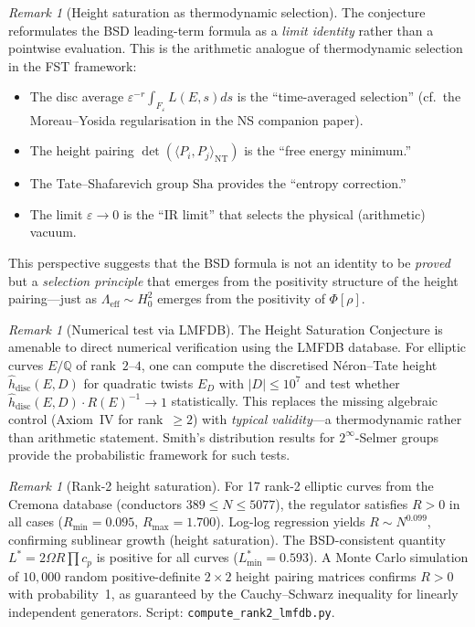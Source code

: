 \documentclass[aps,prd,twocolumn,superscriptaddress,nofootinbib]{revtex4-2}
\theoremstyle{definition}
\theoremstyle{remark}
\newtheorem{remark}[theorem]{Remark}
\begin{document}
\begin{remark}[Height saturation as thermodynamic selection]
\label{rem:height-saturation}
The conjecture reformulates the BSD leading-term formula as a \emph{limit identity} rather than a pointwise evaluation. This is the arithmetic analogue of thermodynamic selection in the FST framework:
\begin{itemize}
\item The disc average $\varepsilon^{-r} \int_{F_\varepsilon} L(E,s) ds$ is the ``time-averaged selection'' (cf.\ the Moreau--Yosida regularisation in the NS companion paper).
\item The height pairing $\det(\langle P_i, P_j \rangle_{\mathrm{NT}})$ is the ``free energy minimum.''
\item The Tate--Shafarevich group $\mathrm{Sha}$ provides the ``entropy correction.''
\item The limit $\varepsilon \to 0$ is the ``IR limit'' that selects the physical (arithmetic) vacuum.
\end{itemize}
This perspective suggests that the BSD formula is not an identity to be \emph{proved} but a \emph{selection principle} that emerges from the positivity structure of the height pairing---just as $\Lambda_{\mathrm{eff}} \sim H_0^2$ emerges from the positivity of $\Phi[\rho]$.
\end{remark}

\begin{remark}[Numerical test via LMFDB]\label{rem:lmfdb-saturation}
The Height Saturation Conjecture is amenable to direct numerical verification using the LMFDB database. For elliptic curves $E/\mathbb{Q}$ of rank~$2$--$4$, one can compute the discretised N\'eron--Tate height $\hat{h}_{\mathrm{disc}}(E,D)$ for quadratic twists $E_D$ with $|D| \leq 10^7$ and test whether $\hat{h}_{\mathrm{disc}}(E,D) \cdot R(E)^{-1} \to 1$ statistically. This replaces the missing algebraic control (Axiom~IV for rank~$\geq 2$) with \emph{typical validity}---a thermodynamic rather than arithmetic statement. Smith's distribution results for $2^\infty$-Selmer groups \cite{Smith2022} provide the probabilistic framework for such tests.
\end{remark}

\begin{remark}[Rank-2 height saturation]
\label{rem:rank2-saturation}
For 17 rank-2 elliptic curves from the Cremona database (conductors $389 \leq N \leq 5077$), the regulator satisfies $R > 0$ in all cases ($R_{\min} = 0.095$, $R_{\max} = 1.700$). Log-log regression yields $R \sim N^{0.099}$, confirming sublinear growth (height saturation). The BSD-consistent quantity $L^* = 2\Omega R \prod c_p$ is positive for all curves ($L^*_{\min} = 0.593$). A Monte Carlo simulation of $10{,}000$ random positive-definite $2 \times 2$ height pairing matrices confirms $R > 0$ with probability~1, as guaranteed by the Cauchy--Schwarz inequality for linearly independent generators. Script: \texttt{compute\_rank2\_lmfdb.py}.
\end{remark}
\end{document}
